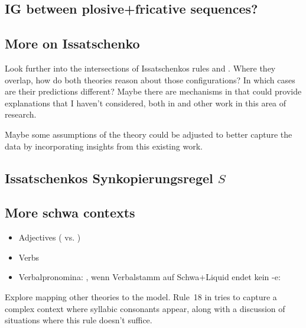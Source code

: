 

\subsection{IG between plosive+fricative sequences?}


\subsection{More on Issatschenko  \CVCV}
Look further into the intersections of Issatschenkos rules
and \CVCV. Where they overlap, how do both theories reason about those configurations?
In which cases are their predictions different?
Maybe there are mechanisms in \CVCV that could provide explanations that I haven't considered,
both in \cite{scheer2004} and other work in this area of research.

Maybe some assumptions of the theory could be adjusted to better capture the data
by incorporating insights from this existing work.



\subsection{Issatschenkos Synkopierungsregel $S$}


\subsection{More schwa contexts}
\begin{itemize}
\item Adjectives ( vs. )
\item Verbs
\item Verbalpronomina: ,
  wenn Verbalstamm auf Schwa+Liquid endet kein -e:
\end{itemize}


Explore mapping other theories to the \CVCV model.
Rule~18 in \cite[p.~176]{hohleVater1978} tries to capture a complex context where
syllabic consonants appear, along with a discussion of situations where this
rule doesn't suffice.

\newcommand\feat[1]{%
  \ensuremath{\left[%
    \renewcommand{\arraystretch}{1}%
    \begin{tabular}{@{}c@{}}#1\end{tabular}%
  \right]}%
}

